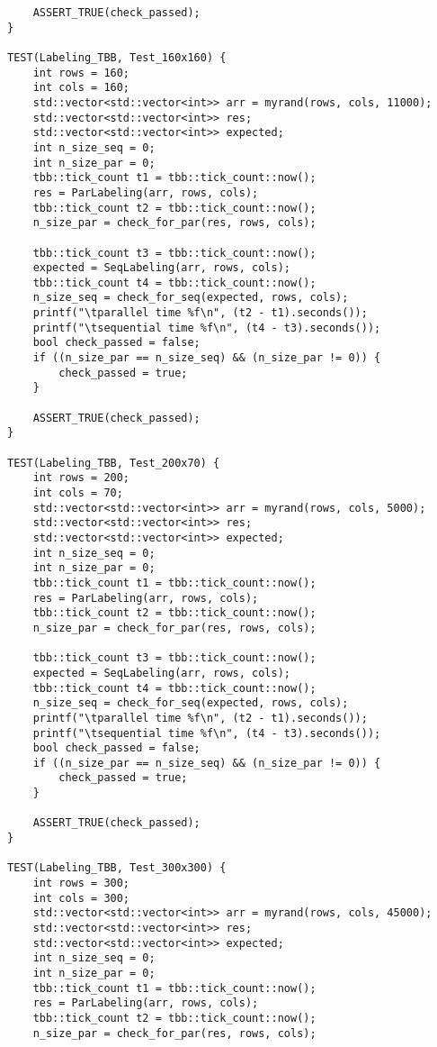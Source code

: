 \documentclass{report}
\begin{document}
\begin{lstlisting}
    ASSERT_TRUE(check_passed);
}

TEST(Labeling_TBB, Test_160x160) {
    int rows = 160;
    int cols = 160;
    std::vector<std::vector<int>> arr = myrand(rows, cols, 11000);
    std::vector<std::vector<int>> res;
    std::vector<std::vector<int>> expected;
    int n_size_seq = 0;
    int n_size_par = 0;
    tbb::tick_count t1 = tbb::tick_count::now();
    res = ParLabeling(arr, rows, cols);
    tbb::tick_count t2 = tbb::tick_count::now();
    n_size_par = check_for_par(res, rows, cols);

    tbb::tick_count t3 = tbb::tick_count::now();
    expected = SeqLabeling(arr, rows, cols);
    tbb::tick_count t4 = tbb::tick_count::now();
    n_size_seq = check_for_seq(expected, rows, cols);
    printf("\tparallel time %f\n", (t2 - t1).seconds());
    printf("\tsequential time %f\n", (t4 - t3).seconds());
    bool check_passed = false;
    if ((n_size_par == n_size_seq) && (n_size_par != 0)) {
        check_passed = true;
    }

    ASSERT_TRUE(check_passed);
}

TEST(Labeling_TBB, Test_200x70) {
    int rows = 200;
    int cols = 70;
    std::vector<std::vector<int>> arr = myrand(rows, cols, 5000);
    std::vector<std::vector<int>> res;
    std::vector<std::vector<int>> expected;
    int n_size_seq = 0;
    int n_size_par = 0;
    tbb::tick_count t1 = tbb::tick_count::now();
    res = ParLabeling(arr, rows, cols);
    tbb::tick_count t2 = tbb::tick_count::now();
    n_size_par = check_for_par(res, rows, cols);

    tbb::tick_count t3 = tbb::tick_count::now();
    expected = SeqLabeling(arr, rows, cols);
    tbb::tick_count t4 = tbb::tick_count::now();
    n_size_seq = check_for_seq(expected, rows, cols);
    printf("\tparallel time %f\n", (t2 - t1).seconds());
    printf("\tsequential time %f\n", (t4 - t3).seconds());
    bool check_passed = false;
    if ((n_size_par == n_size_seq) && (n_size_par != 0)) {
        check_passed = true;
    }

    ASSERT_TRUE(check_passed);
}

TEST(Labeling_TBB, Test_300x300) {
    int rows = 300;
    int cols = 300;
    std::vector<std::vector<int>> arr = myrand(rows, cols, 45000);
    std::vector<std::vector<int>> res;
    std::vector<std::vector<int>> expected;
    int n_size_seq = 0;
    int n_size_par = 0;
    tbb::tick_count t1 = tbb::tick_count::now();
    res = ParLabeling(arr, rows, cols);
    tbb::tick_count t2 = tbb::tick_count::now();
    n_size_par = check_for_par(res, rows, cols);


\end{lstlisting}
\end{document}
